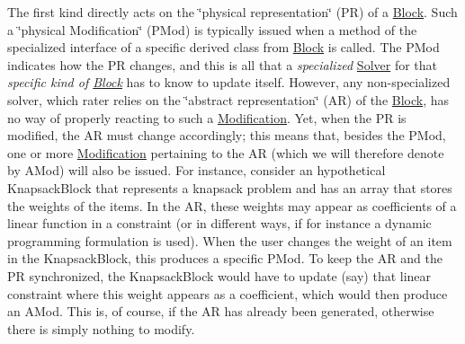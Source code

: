 The first kind directly acts on the \char`\"{}physical representation\char`\"{} (PR) of a \mbox{\hyperlink{class_s_m_spp__di__unipi__it_1_1_block}{Block}}. Such a \char`\"{}physical Modification\char`\"{} (P\+Mod) is typically issued when a method of the specialized interface of a specific derived class from \mbox{\hyperlink{class_s_m_spp__di__unipi__it_1_1_block}{Block}} is called. The P\+Mod indicates how the PR changes, and this is all that a {\itshape specialized} \mbox{\hyperlink{class_s_m_spp__di__unipi__it_1_1_solver}{Solver}} for that {\itshape specific kind of \mbox{\hyperlink{class_s_m_spp__di__unipi__it_1_1_block}{Block}}} has to know to update itself. However, any non-\/specialized solver, which rater relies on the \char`\"{}abstract representation\char`\"{} (AR) of the \mbox{\hyperlink{class_s_m_spp__di__unipi__it_1_1_block}{Block}}, has no way of properly reacting to such a \mbox{\hyperlink{class_s_m_spp__di__unipi__it_1_1_modification}{Modification}}. Yet, when the PR is modified, the AR must change accordingly; this means that, besides the P\+Mod, one or more \mbox{\hyperlink{class_s_m_spp__di__unipi__it_1_1_modification}{Modification}} pertaining to the AR (which we will therefore denote by A\+Mod) will also be issued. For instance, consider an hypothetical Knapsack\+Block that represents a knapsack problem and has an array that stores the weights of the items. In the AR, these weights may appear as coefficients of a linear function in a constraint (or in different ways, if for instance a dynamic programming formulation is used). When the user changes the weight of an item in the Knapsack\+Block, this produces a specific P\+Mod. To keep the AR and the PR synchronized, the Knapsack\+Block would have to update (say) that linear constraint where this weight appears as a coefficient, which would then produce an A\+Mod. This is, of course, if the AR has already been generated, otherwise there is simply nothing to modify.

